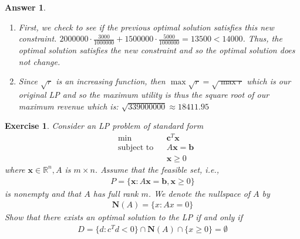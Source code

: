 \documentclass[12pt]{article}
\theoremstyle{colon}
\newtheorem{exercise}{Exercise}
\newtheorem*{answer}{Answer}
\begin{document}
\begin{answer}
\begin{enumerate}[label=\arabic*)]
    \item First, we check to see if the previous optimal solution satisfies this new constraint. $2000000 \cdot \frac{3000}{1000000} + 1500000 \cdot \frac{5000}{1000000} = 13500 < 14000$. Thus, the optimal solution satisfies the new constraint and so the optimal solution does not change.
    \item Since $\sqrt{r}$ is an increasing function, then $\max \sqrt{r} = \sqrt{\max r}$ which is our original LP and so the maximum utility is thus the square root of our maximum revenue which is: $\sqrt{339000000} \approx 18411.95$
  \end{enumerate}
\end{answer}

\clearpage

\begin{exercise}
  Consider an LP problem of standard form
  \begin{align*}
    &\min &&\textbf{c}^T \textbf{x} \\
    &\text{subject to} &&A\textbf{x} = \textbf{b} \\
    & &&\textbf{x} \geq 0
  \end{align*}
  where $\textbf{x} \in \mathbb{R}^n, A$ is $m \times n$. Assume that the feasible set, i.e.,
  \begin{gather*}
    P = \{ \textbf{x}: A\textbf{x} = \textbf{b}, \textbf{x} \geq 0 \}
  \end{gather*}
  is nonempty and that $A$ has full rank $m$. We denote the nullspace of $A$ by
  \begin{gather*}
    \textbf{N}(A) = \{ x: Ax = 0 \}
  \end{gather*}
  Show that there exists an optimal solution to the LP if and only if
  \begin{gather*}
    D = \{ d: c^T d < 0  \} \cap \textbf{N}(A) \cap \{ x \geq 0 \} = \emptyset
  \end{gather*}
\end{exercise}
\end{document}
